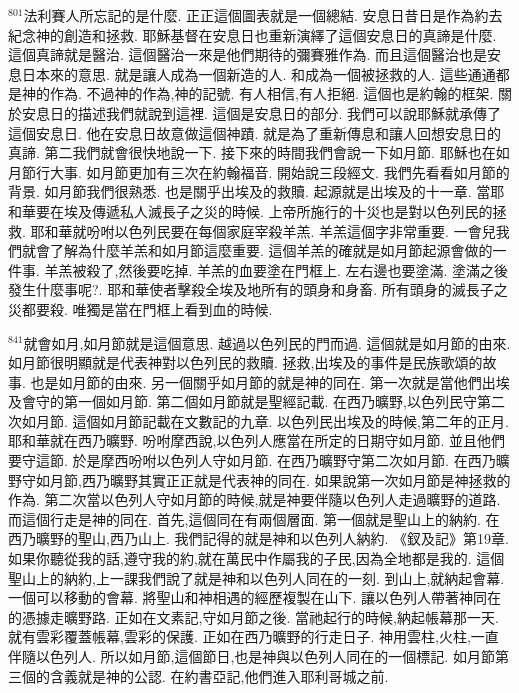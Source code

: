 \documentclass{book}
\begin{document}
$^{801}$法利賽人所忘記的是什麼.
正正這個圖表就是一個總結.
安息日昔日是作為約去紀念神的創造和拯救.
耶穌基督在安息日也重新演繹了這個安息日的真諦是什麼.
這個真諦就是醫治.
這個醫治一來是他們期待的彌賽雅作為.
而且這個醫治也是安息日本來的意思.
就是讓人成為一個新造的人.
和成為一個被拯救的人.
這些通通都是神的作為.
不過神的作為,神的記號.
有人相信,有人拒絕.
這個也是約翰的框架.
關於安息日的描述我們就說到這裡.
這個是安息日的部分.
我們可以說耶穌就承傳了這個安息日.
他在安息日故意做這個神蹟.
就是為了重新傳息和讓人回想安息日的真諦.
第二我們就會很快地說一下.
接下來的時間我們會說一下如月節.
耶穌也在如月節行大事.
如月節更加有三次在約翰福音.
開始說三段經文.
我們先看看如月節的背景.
如月節我們很熟悉.
也是關乎出埃及的救贖.
起源就是出埃及的十一章.
當耶和華要在埃及傳遞私人滅長子之災的時候.
上帝所施行的十災也是對以色列民的拯救.
耶和華就吩咐以色列民要在每個家庭宰殺羊羔.
羊羔這個字非常重要.
一會兒我們就會了解為什麼羊羔和如月節這麼重要.
這個羊羔的確就是如月節起源會做的一件事.
羊羔被殺了,然後要吃掉.
羊羔的血要塗在門框上.
左右邊也要塗滿.
塗滿之後發生什麼事呢?.
耶和華使者擊殺全埃及地所有的頭身和身畜.
所有頭身的滅長子之災都要殺.
唯獨是當在門框上看到血的時候.

$^{841}$就會如月,如月節就是這個意思.
越過以色列民的門而過.
這個就是如月節的由來.
如月節很明顯就是代表神對以色列民的救贖.
拯救,出埃及的事件是民族歌頌的故事.
也是如月節的由來.
另一個關乎如月節的就是神的同在.
第一次就是當他們出埃及會守的第一個如月節.
第二個如月節就是聖經記載.
在西乃曠野,以色列民守第二次如月節.
這個如月節記載在文數記的九章.
以色列民出埃及的時候,第二年的正月.
耶和華就在西乃曠野.
吩咐摩西說,以色列人應當在所定的日期守如月節.
並且他們要守這節.
於是摩西吩咐以色列人守如月節.
在西乃曠野守第二次如月節.
在西乃曠野守如月節,西乃曠野其實正正就是代表神的同在.
如果說第一次如月節是神拯救的作為.
第二次當以色列人守如月節的時候,就是神要伴隨以色列人走過曠野的道路.
而這個行走是神的同在.
首先,這個同在有兩個層面.
第一個就是聖山上的納約.
在西乃曠野的聖山,西乃山上.
我們記得的就是神和以色列人納約.
《釵及記》第19章.
如果你聽從我的話,遵守我的約,就在萬民中作屬我的子民,因為全地都是我的.
這個聖山上的納約,上一課我們說了就是神和以色列人同在的一刻.
到山上,就納起會幕.
一個可以移動的會幕.
將聖山和神相遇的經歷複製在山下.
讓以色列人帶著神同在的憑據走曠野路.
正如在文素記,守如月節之後.
當祂起行的時候,納起帳幕那一天.
就有雲彩覆蓋帳幕,雲彩的保護.
正如在西乃曠野的行走日子.
神用雲柱,火柱,一直伴隨以色列人.
所以如月節,這個節日,也是神與以色列人同在的一個標記.
如月節第三個的含義就是神的公認.
在約書亞記,他們進入耶利哥城之前.
\end{document}
